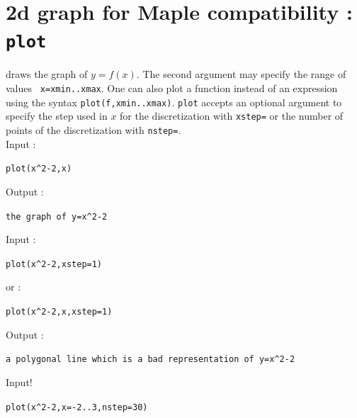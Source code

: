 \documentclass[a4paper,11pt]{book}
\begin{document}
\section{2d graph for Maple compatibility : {\tt plot}}
 \label{sec:plot2d}
 draws the graph of $y=f(x)$. 
The second argument may specify the range of values {\tt
  x=xmin..xmax}. One can also plot a function instead of an
expression using the syntax {\tt plot(f,xmin..xmax)}.
{\tt plot} accepts an optional argument to specify 
the step used in $x$ for the discretization with  
\verb|xstep=| or the number of points of the discretization
with \verb|nstep=|.\\
Input :
\begin{center}{\tt  plot(x\verb|^|2-2,x)}\end{center}
Output :
\begin{center}{\tt the graph of y=x\verb|^|2-2}\end{center}
Input :
\begin{center}{\tt  plot(x\verb|^|2-2,xstep=1)}\end{center}
or :
\begin{center}{\tt  plot(x\verb|^|2-2,x,xstep=1)}\end{center}
Output :
\begin{center}{\tt a polygonal line which is a bad representation of
    y=x\verb|^|2-2 }\end{center}
Input!
\begin{center}{\tt  plot(x\verb|^|2-2,x=-2..3,nstep=30)}\end{center}
\end{document}
